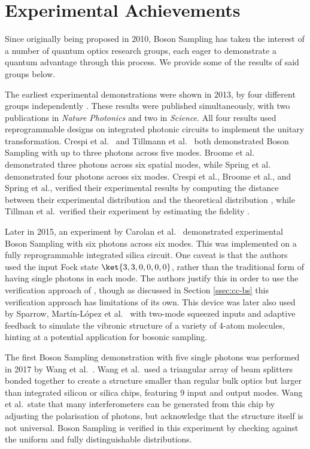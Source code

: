 \section{Experimental Achievements}
\label{sec:experimental-achievements}

Since originally being proposed in 2010, Boson Sampling has taken the interest of a number of quantum optics research groups, each eager to demonstrate a quantum advantage through this process. We provide some of the results of said groups below.

The earliest experimental demonstrations were shown in 2013, by four different groups independently \cite{broome2013, spring2013, tillmann2013, crespi2013}. These results were published simultaneously, with two publications in \emph{Nature Photonics} and two in \emph{Science}. All four results used reprogrammable designs on integrated photonic circuits to implement the unitary transformation. Crespi et al.~\cite{crespi2013} and Tillmann et al.~\cite{tillmann2013} both demonstrated Boson Sampling with up to three photons across five modes. Broome et al.~\cite{broome2013} demonstrated three photons across six spatial modes, while Spring et al.~\cite{spring2013} demonstrated four photons across six modes. Crespi et al., Broome et al., and Spring et al., verified their experimental results by computing the distance between their experimental distribution and the theoretical distribution \cite{spring2013, tillmann2013, crespi2013}, while Tillman et al.\ verified their experiment by estimating the fidelity \cite{tillmann2013}.

Later in 2015, an experiment by Carolan et al.~\cite{carolan2015} demonstrated experimental Boson Sampling with six photons across six modes. This was implemented on a fully reprogrammable integrated silica circuit. One caveat is that the authors used the input Fock state $\ket{3,3,0,0,0,0}$, rather than the traditional form of having single photons in each mode. The authors justify this in order to use the verification approach of \cite{carolan2014}, though as discussed in Section \ref{ssec:cc-bs} this verification approach has limitations of its own. This device was later also used by Sparrow, Mart\'{i}n-L\'{o}pez et al.~\cite{sparrow2018} with two-mode squeezed inputs and adaptive feedback to simulate the vibronic structure of a variety of 4-atom molecules, hinting at a potential application for bosonic sampling.

The first Boson Sampling demonstration with five single photons was performed in 2017 by Wang et al.~\cite{wang2017}. Wang et al.\ used a triangular array of beam splitters bonded together to create a structure smaller than regular bulk optics but larger than integrated silicon or silica chips, featuring 9 input and output modes. Wang et al.\ state that many interferometers can be generated from this chip by adjusting the polarisation of photons, but acknowledge that the structure itself is not universal. Boson Sampling is verified in this experiment by checking against the uniform and fully distinguishable distributions.

